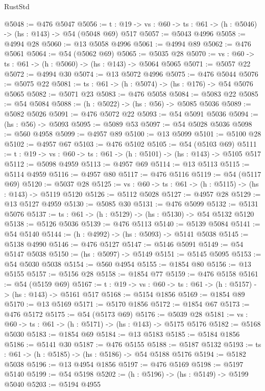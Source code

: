 \begin{lexlean}{RustStd}
\begin{coremodule}
@5048 := @476 @5047
@5056 := {t : @19} -> {vs : @60} -> {ts : @61} -> (h : @5046) -> (hs : @143) -> @54 (@5048 @69) @517
@5057 := @5043 @4996
@5058 := @4994 @28
@5060 := @13 @5058 @4996
@5061 := @4994 @89
@5062 := @476 @5061
@5064 := @54 (@5062 @69)
@5065 := @5035 @28
@5070 := {vs : @60} -> {ts : @61} -> (h : @5060) -> (hs : @143) -> @5064 @5065
@5071 := @5057 @22
@5072 := @4994 @30
@5074 := @13 @5072 @4996
@5075 := @476 @5044
@5076 := @5075 @22
@5081 := {ts : @61} -> (h : @5074) -> (hs : @176) -> @54 @5076 @5065
@5082 := @5071 @23
@5083 := @476 @5058
@5084 := @5083 @22
@5085 := @54 @5084
@5088 := (h : @5022) -> (hs : @56) -> @5085 @5036
@5089 := @5082 @5026
@5091 := @476 @5072 @22
@5093 := @54 @5091 @5036
@5094 := (hs : @56) -> @5093
@5095 := @5089 @53
@5097 := @54 @5028 @5036
@5098 := @560 @4958
@5099 := @4957 @89
@5100 := @13 @5099
@5101 := @5100 @28
@5102 := @4957 @67
@5103 := @476 @5102
@5105 := @54 (@5103 @69)
@5111 := {t : @19} -> {vs : @60} -> {ts : @61} -> (h : @5101) -> (hs : @143) -> @5105 @517
@5112 := @5098 @4959
@5113 := @4957 @69
@5114 := @13 @5113
@5115 := @5114 @4959
@5116 := @4957 @80
@5117 := @476 @5116
@5119 := @54 (@5117 @69)
@5120 := @5037 @28
@5125 := {vs : @60} -> {ts : @61} -> (h : @5115) -> (hs : @143) -> @5119 @5120
@5126 := @5112 @5028
@5127 := @4957 @28
@5129 := @13 @5127 @4959
@5130 := @5085 @30
@5131 := @476 @5099
@5132 := @5131 @5076
@5137 := {ts : @61} -> (h : @5129) -> (hs : @5130) -> @54 @5132 @5120
@5138 := @5126 @5036
@5139 := @476 @5113
@5140 := @5139 @5084
@5141 := @54 @5140
@5144 := (h : @4992) -> (hs : @5093) -> @5141 @5038
@5145 := @5138 @4990
@5146 := @476 @5127
@5147 := @5146 @5091
@5149 := @54 @5147 @5038
@5150 := (hs : @5097) -> @5149
@5151 := @5145 @5095
@5153 := @54 @5030 @5038
@5154 := @560 @4954
@5155 := @1854 @80
@5156 := @13 @5155
@5157 := @5156 @28
@5158 := @1854 @77
@5159 := @476 @5158
@5161 := @54 (@5159 @69)
@5167 := {t : @19} -> {vs : @60} -> {ts : @61} -> (h : @5157) -> (hs : @143) -> @5161 @517
@5168 := @5154 @1856
@5169 := @1854 @89
@5170 := @13 @5169
@5171 := @5170 @1856
@5172 := @1854 @67
@5173 := @476 @5172
@5175 := @54 (@5173 @69)
@5176 := @5039 @28
@5181 := {vs : @60} -> {ts : @61} -> (h : @5171) -> (hs : @143) -> @5175 @5176
@5182 := @5168 @5030
@5183 := @1854 @69
@5184 := @13 @5183
@5185 := @5184 @1856
@5186 := @5141 @30
@5187 := @476 @5155
@5188 := @5187 @5132
@5193 := {ts : @61} -> (h : @5185) -> (hs : @5186) -> @54 @5188 @5176
@5194 := @5182 @5038
@5196 := @13 @4954 @1856
@5197 := @476 @5169
@5198 := @5197 @5140
@5199 := @54 @5198
@5202 := (h : @5196) -> (hs : @5149) -> @5199 @5040
@5203 := @5194 @4955

\end{coremodule}
\end{lexlean}
